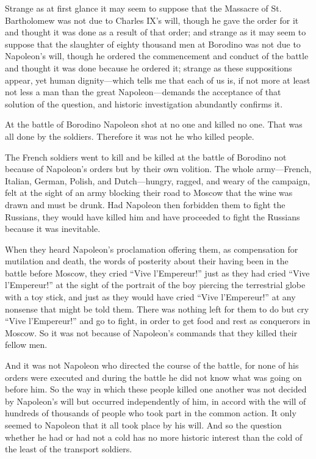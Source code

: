 Strange as at first glance it may seem to suppose that the
Massacre of St. Bartholomew was not due to Charles IX's will,
though he gave the order for it and thought it was done as a
result of that order; and strange as it may seem to suppose that
the slaughter of eighty thousand men at Borodino was not due to
Napoleon's will, though he ordered the commencement and conduct
of the battle and thought it was done because he ordered it;
strange as these suppositions appear, yet human dignity---which
tells me that each of us is, if not more at least not less a man
than the great Napoleon---demands the acceptance of that solution
of the question, and historic investigation abundantly confirms
it.

At the battle of Borodino Napoleon shot at no one and killed no
one.  That was all done by the soldiers. Therefore it was not he
who killed people.

The French soldiers went to kill and be killed at the battle of
Borodino not because of Napoleon's orders but by their own
volition. The whole army---French, Italian, German, Polish, and
Dutch---hungry, ragged, and weary of the campaign, felt at the
sight of an army blocking their road to Moscow that the wine was
drawn and must be drunk. Had Napoleon then forbidden them to
fight the Russians, they would have killed him and have proceeded
to fight the Russians because it was inevitable.

When they heard Napoleon's proclamation offering them, as
compensation for mutilation and death, the words of posterity
about their having been in the battle before Moscow, they cried
``Vive l'Empereur!'' just as they had cried ``Vive l'Empereur!''
at the sight of the portrait of the boy piercing the terrestrial
globe with a toy stick, and just as they would have cried ``Vive
l'Empereur!'' at any nonsense that might be told them.  There was
nothing left for them to do but cry ``Vive l'Empereur!'' and go
to fight, in order to get food and rest as conquerors in
Moscow. So it was not because of Napoleon's commands that they
killed their fellow men.

And it was not Napoleon who directed the course of the battle,
for none of his orders were executed and during the battle he did
not know what was going on before him. So the way in which these
people killed one another was not decided by Napoleon's will but
occurred independently of him, in accord with the will of
hundreds of thousands of people who took part in the common
action. It only seemed to Napoleon that it all took place by his
will. And so the question whether he had or had not a cold has no
more historic interest than the cold of the least of the
transport soldiers.

